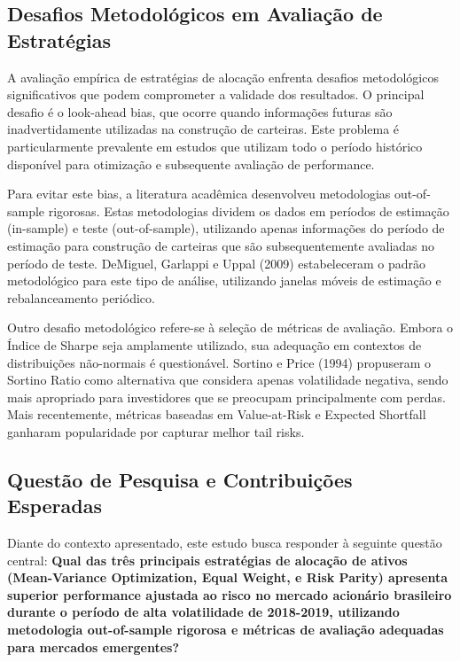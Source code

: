 \subsection{Desafios Metodológicos em Avaliação de Estratégias}

A avaliação empírica de estratégias de alocação enfrenta desafios metodológicos significativos que podem comprometer a validade dos resultados. O principal desafio é o look-ahead bias, que ocorre quando informações futuras são inadvertidamente utilizadas na construção de carteiras. Este problema é particularmente prevalente em estudos que utilizam todo o período histórico disponível para otimização e subsequente avaliação de performance.

Para evitar este bias, a literatura acadêmica desenvolveu metodologias out-of-sample rigorosas. Estas metodologias dividem os dados em períodos de estimação (in-sample) e teste (out-of-sample), utilizando apenas informações do período de estimação para construção de carteiras que são subsequentemente avaliadas no período de teste. DeMiguel, Garlappi e Uppal (2009) estabeleceram o padrão metodológico para este tipo de análise, utilizando janelas móveis de estimação e rebalanceamento periódico.

Outro desafio metodológico refere-se à seleção de métricas de avaliação. Embora o Índice de Sharpe seja amplamente utilizado, sua adequação em contextos de distribuições não-normais é questionável. Sortino e Price (1994) propuseram o Sortino Ratio como alternativa que considera apenas volatilidade negativa, sendo mais apropriado para investidores que se preocupam principalmente com perdas. Mais recentemente, métricas baseadas em Value-at-Risk e Expected Shortfall ganharam popularidade por capturar melhor tail risks.

\subsection{Questão de Pesquisa e Contribuições Esperadas}

Diante do contexto apresentado, este estudo busca responder à seguinte questão central: \textbf{Qual das três principais estratégias de alocação de ativos (Mean-Variance Optimization, Equal Weight, e Risk Parity) apresenta superior performance ajustada ao risco no mercado acionário brasileiro durante o período de alta volatilidade de 2018-2019, utilizando metodologia out-of-sample rigorosa e métricas de avaliação adequadas para mercados emergentes?}

